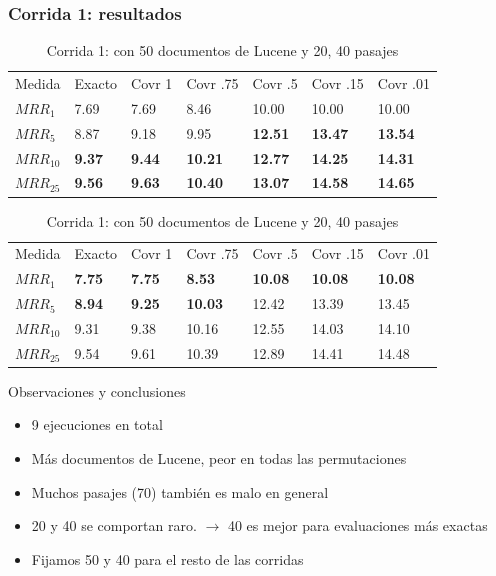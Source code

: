 \begin{frame}
\frametitle{Corrida 1: resultados}

\begin{table}
\centering
\begin{center}
\begin{tabular}{|l | l | l | l | l | l | l |}

Medida & Exacto & Covr 1 & Covr .75 & Covr .5 & Covr .15 & Covr .01 \\ 
$MRR_{1}$ & 7.69 & 7.69 & 8.46 & 10.00 & 10.00 & 10.00  \\ 
$MRR_{5}$ & 8.87 & 9.18 & 9.95 & \textbf{12.51} & \textbf{13.47} & \textbf{13.54}  \\ 
$MRR_{10}$ & \textbf{9.37} & \textbf{9.44} & \textbf{10.21} & \textbf{12.77} & \textbf{14.25} & \textbf{14.31}  \\ 
$MRR_{25}$ & \textbf{9.56} & \textbf{9.63} & \textbf{10.40} & \textbf{13.07} & \textbf{14.58} & \textbf{14.65}  \\ 
\end{tabular}

\medskip
\medskip

\begin{tabular}{|l | l | l | l | l | l | l |}
Medida & Exacto & Covr 1 & Covr .75 & Covr .5 & Covr .15 & Covr .01 \\ 
$MRR_{1}$ & \textbf{7.75} & \textbf{7.75} & \textbf{8.53} & \textbf{10.08} & \textbf{10.08} & \textbf{10.08}  \\ 
$MRR_{5}$ & \textbf{8.94} & \textbf{9.25} & \textbf{10.03} & 12.42 & 13.39 & 13.45  \\ 
$MRR_{10}$ & 9.31 & 9.38 & 10.16 & 12.55 & 14.03 & 14.10  \\ 
$MRR_{25}$ & 9.54 & 9.61 & 10.39 & 12.89 & 14.41 & 14.48  \\ 
\end{tabular}
\caption{Corrida 1: con 50 documentos de Lucene y 20, 40 pasajes}
\end{center}
\end{table}

Observaciones y conclusiones
\begin{itemize}
  \item 9 ejecuciones en total
  \item Más documentos de Lucene, peor en todas las permutaciones
  \item Muchos pasajes (70) también es malo en general
  \item 20 y 40 se comportan raro. $\rightarrow$ 40 es mejor para evaluaciones más exactas
  \item Fijamos 50 y 40 para el resto de las corridas
\end{itemize}

\end{frame}


